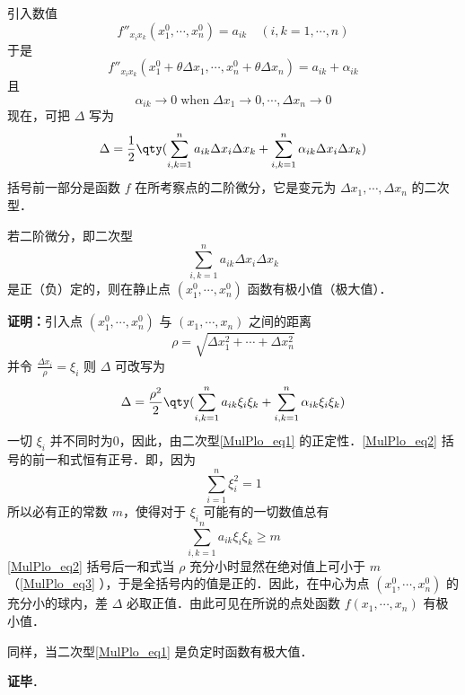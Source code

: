 引入数值
\begin{equation}
f''_{x_ix_k}(x_1^0,\cdots,x_n^0)=a_{ik}\quad (i,k=1,\cdots,n)
\end{equation}
于是
\begin{equation}
f''_{x_ix_k}(x_1^0+\theta\Delta x_1,\cdots,x_n^0+\theta\Delta x_n)=a_{ik}+\alpha_{ik}
\end{equation}
且
\begin{equation}\label{MulPlo_eq3}
\alpha_{ik}\rightarrow 0\;\mathrm{when}\;\Delta x_1\rightarrow0,\cdots,\Delta x_n\rightarrow0
\end{equation}
现在，可把 $\Delta$ 写为
\begin{equation}
\Delta=\frac{1}{2}\qty(\sum_{i,k=1}^na_{ik}\Delta x_i\Delta x_k+\sum_{i,k=1}^n\alpha_{ik}\Delta x_i\Delta x_k )
\end{equation}
括号前一部分是函数 $f$ 在所考察点的二阶微分，它是变元为 $\Delta x_1,\cdots,\Delta x_n$ 的二次型．
\begin{theorem}{}
若二阶微分，即二次型
\begin{equation}\label{MulPlo_eq1}
\sum_{i,k=1}^na_{ik}\Delta x_i\Delta x_k
\end{equation}
是正（负）定的，则在静止点 $(x_1^0,\cdots,x_n^0)$ 函数有极小值（极大值）．
\end{theorem}
\textbf{证明：}引入点 $(x_1^0,\cdots,x_n^0)$ 与 $(x_1,\cdots,x_n)$ 之间的距离
\begin{equation}
\rho=\sqrt{\Delta x_1^2+\cdots+\Delta x_n^2}
\end{equation}
 并令 $\frac{\Delta x_i}{\rho}=\xi_i$
 则 $\Delta$ 可改写为
 \begin{equation}\label{MulPlo_eq2}
 \Delta=\frac{\rho^2}{2}\qty(\sum_{i,k=1}^na_{ik}\xi_i\xi_k+\sum_{i,k=1}^n\alpha_{ik} \xi_i\xi_k)
 \end{equation}
 一切 $\xi_i$ 并不同时为0，因此，由二次型\autoref{MulPlo_eq1} 的正定性．\autoref{MulPlo_eq2} 括号的前一和式恒有正号．即，因为
 \begin{equation}
 \sum_{i=1}^n\xi_i^2=1
 \end{equation}
 所以必有正的常数 $m$，使得对于 $\xi_i$ 可能有的一切数值总有
 \begin{equation}
 \sum_{i,k=1}^na_{ik}\xi_i\xi_k\geq m
 \end{equation}
 \autoref{MulPlo_eq2} 括号后一和式当 $\rho$ 充分小时显然在绝对值上可小于 $m$（\autoref{MulPlo_eq3} ），于是全括号内的值是正的．因此，在中心为点 $(x_1^0,\cdots,x_n^0)$ 的充分小的球内，差 $\Delta$ 必取正值．由此可见在所说的点处函数 $f(x_1,\cdots,x_n)$ 有极小值．

 同样，当二次型\autoref{MulPlo_eq1} 是负定时函数有极大值．

\textbf{证毕}．
